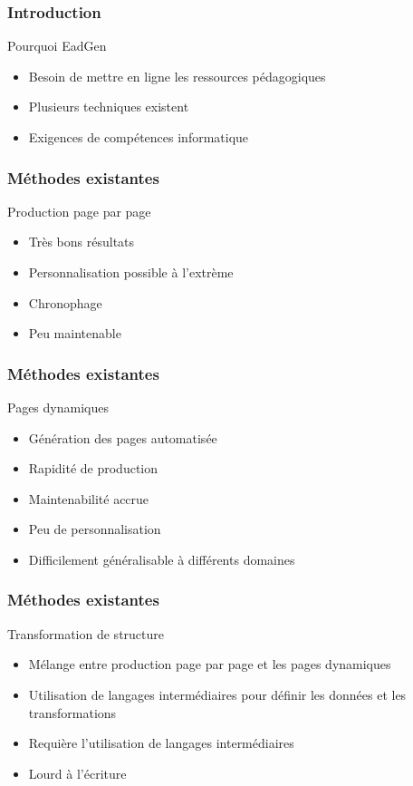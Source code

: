 \begin{frame}
	\frametitle{Introduction}
	\begin{block}{Pourquoi EadGen}
		\begin{itemize}
			\item Besoin de mettre en ligne les ressources pédagogiques 
			\item Plusieurs techniques existent
			\item Exigences de compétences informatique
		\end{itemize}
	\end{block}
\end{frame}

\author{Guillaume Minette de Saint-Martin}
\begin{frame}
	\frametitle{Méthodes existantes}
	\begin{block}{Production page par page}
		\begin{itemize}
			\item Très bons résultats
			\item Personnalisation possible à l'extrème
			\item Chronophage
			\item Peu maintenable
		\end{itemize}
	\end{block}
\end{frame}
\begin{frame}
	\frametitle{Méthodes existantes}
	\begin{block}{Pages dynamiques}
		\begin{itemize}
			\item Génération des pages automatisée
			\item Rapidité de production
			\item Maintenabilité accrue
			\item Peu de personnalisation
			\item Difficilement généralisable à différents domaines
		\end{itemize}
	\end{block}
\end{frame}
\begin{frame}
	\frametitle{Méthodes existantes}
	\begin{block}{Transformation de structure}
		\begin{itemize}
			\item Mélange entre production page par page et les pages dynamiques
			\item Utilisation de langages intermédiaires pour définir les données et les transformations
			\item Requière l'utilisation de langages intermédiaires 
			\item Lourd à l'écriture
		\end{itemize}
	\end{block}
\end{frame}